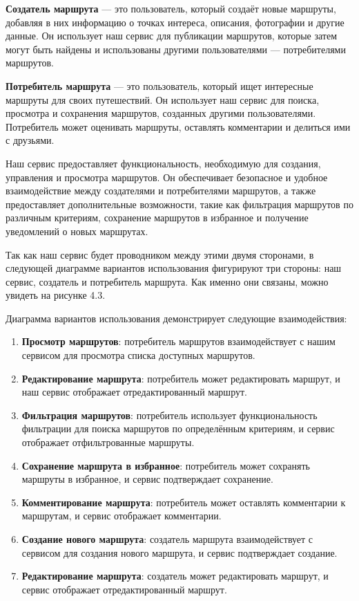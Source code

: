 \textbf{Создатель маршрута} — это пользователь, который создаёт новые маршруты, добавляя в них информацию о точках интереса, описания, фотографии и другие данные. Он использует наш сервис для публикации маршрутов, которые затем могут быть найдены и использованы другими пользователями — потребителями маршрутов.

\textbf{Потребитель маршрута} — это пользователь, который ищет интересные маршруты для своих путешествий. Он использует наш сервис для поиска, просмотра и сохранения маршрутов, созданных другими пользователями. Потребитель может оценивать маршруты, оставлять комментарии и делиться ими с друзьями.

Наш сервис предоставляет функциональность, необходимую для создания, управления и просмотра маршрутов. Он обеспечивает безопасное и удобное взаимодействие между создателями и потребителями маршрутов, а также предоставляет дополнительные возможности, такие как фильтрация маршрутов по различным критериям, сохранение маршрутов в избранное и получение уведомлений о новых маршрутах.

Так как наш сервис будет проводником между этими двумя сторонами, в следующей диаграмме вариантов использования фигурируют три стороны: наш сервис, создатель и потребитель маршрута. Как именно они связаны, можно увидеть на рисунке 4.3.

Диаграмма вариантов использования демонстрирует следующие взаимодействия:

\begin{enumerate}
    \item \textbf{Просмотр маршрутов}: потребитель маршрутов взаимодействует с нашим сервисом для просмотра списка доступных маршрутов.
    \item \textbf{Редактирование маршрута}: потребитель может редактировать маршрут, и наш сервис отображает отредактированный маршрут.
    \item \textbf{Фильтрация маршрутов}: потребитель использует функциональность фильтрации для поиска маршрутов по определённым критериям, и сервис отображает отфильтрованные маршруты.
    \item \textbf{Сохранение маршрута в избранное}: потребитель может сохранять маршруты в избранное, и сервис подтверждает сохранение.
    \item \textbf{Комментирование маршрута}: потребитель может оставлять комментарии к маршрутам, и сервис отображает комментарии.
    \item \textbf{Создание нового маршрута}: создатель маршрута взаимодействует с сервисом для создания нового маршрута, и сервис подтверждает создание.
    \item \textbf{Редактирование маршрута}: создатель может редактировать маршрут, и сервис отображает отредактированный маршрут.
\end{enumerate}

